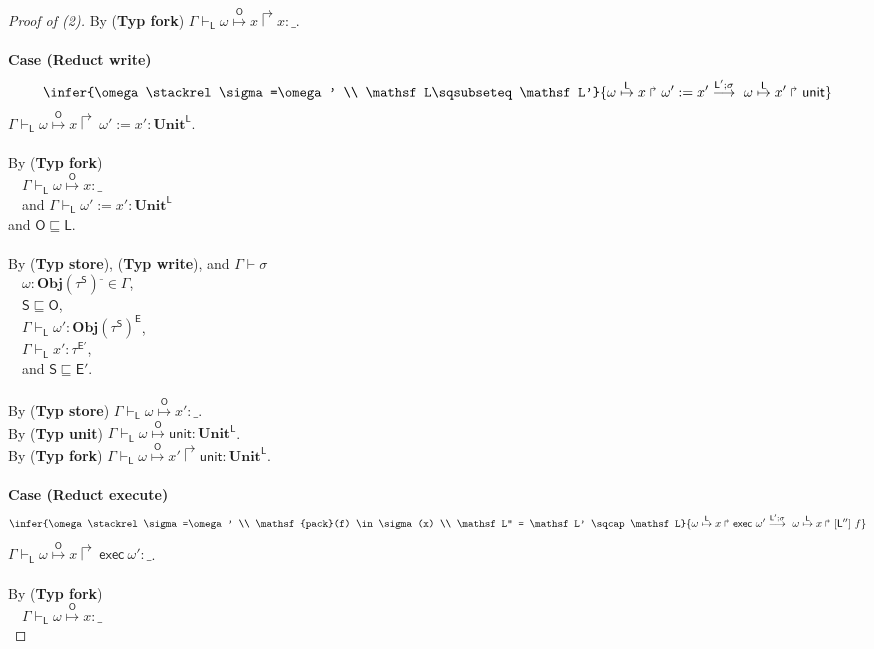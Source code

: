 \documentclass{sigplanconf}
\newcommand{\lab}{\mathsf L}
\newcommand{\labo}{\mathsf O}
\newcommand{\labb}{\mathsf S}
\newcommand{\labt}{\mathsf E}
\newcommand{\action}[1]{\stackrel{#1}{\longrightarrow}~}
\newcommand{\fork}[2]{#1\Rsh\:\!#2}
\newcommand{\store}[1]{\stackrel{#1}\mapsto}
\newcommand{\trule}[1]{(\textbf{Typ #1})}
\begin{document}
\begin{proof}[Proof of (2)]
By \trule{fork} $\Gamma \vdash_\lab \omega \store{\labo} x \Rsh x : \_$. \\
\\
{\bf Case (Reduct write)}
$$\infer
    {\omega \stackrel\sigma=\omega' \\ \lab \sqsubseteq \lab'}
    {\fork{\omega \store\lab x} \omega' := x' \action{\lab';\sigma} \fork{\omega \store\lab x'} \mathsf{unit}}
$$
$\Gamma \vdash_\lab \fork{\omega \store{\labo} x} \omega' := x' : \mathbf{Unit}^\lab$.\\
\\
By \trule{fork}\\
$~~~$ $\Gamma \vdash_\lab \omega \store{\labo} x : \_$ \\
$~~~$ and $\Gamma \vdash_\lab \omega' := x' : \mathbf{Unit}^{\lab}$\\
and $\labo \sqsubseteq \lab$.\\
\\
By \trule{store}, \trule{write}, and $\Gamma \vdash \sigma$\\
$~~~$ $\omega: \mathbf{Obj}(\tau^{\labb})^\_ \in \Gamma$,\\
$~~~$ $\labb \sqsubseteq \labo$, \\
$~~~$ $\Gamma \vdash_\lab \omega' : \mathbf{Obj}(\tau^{\labb})^{\labt}$, \\
$~~~$ $\Gamma \vdash_\lab x' : \tau^{\labt'}$, \\
$~~~$ and $\labb \sqsubseteq \labt'$.\\
\\
By \trule{store} $\Gamma \vdash_\lab \omega \store{\labo} x' : \_$. \\
By \trule{unit} $\Gamma \vdash_\lab \omega \store{\labo} \mathsf{unit} : \mathbf{Unit}^\lab$. \\
By \trule{fork} $\Gamma \vdash_\lab \omega \store{\labo} x' \Rsh \mathsf{unit} : \mathbf{Unit}^\lab$.\\
\\
{\bf Case (Reduct execute)}
$$\infer
    {\omega \stackrel\sigma=\omega' \\ \mathsf{pack}(f) \in \sigma(x) \\ \lab'' = \lab' \sqcap \lab}
    {\fork{\omega \store\lab x}\mathsf{exec}~\omega' \action{\lab';\sigma} \fork{\omega \store\lab x}[\lab'']~f}
$$
$\Gamma \vdash_\lab \fork{\omega \store{\labo} x} \mathsf{exec}~\omega' : \_$.\\
\\
By \trule{fork}\\
$~~~$ $\Gamma \vdash_\lab \omega \store{\labo} x : \_$ \\

\end{proof}
\end{document}
